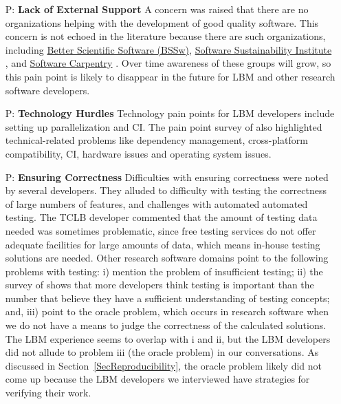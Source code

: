 \documentclass[final, 3p, times, authoryear]{elsarticle}
\newcounter{pnum} %
\begin{document}
\begin{enumerate}
	\item[P\refstepcounter{pnum}\thepnum \label{P_LackExtSupport}:] \textbf{Lack
	of External Support} A concern was raised that there are no organizations
	helping with the development of good quality software.  This concern is not
	echoed in the literature because there are such organizations, including
	\href{https://bssw.io/} {Better Scientific Software (BSSw)},
	\href{https://www.software.ac.uk/} {Software Sustainability Institute}
	\citep{CrouchEtAl2013}, and \href{https://software-carpentry.org/}{Software
	Carpentry} \citep{WilsonAndLumsdaine2006, Wilson2016}. Over time awareness
	of these groups will grow, so this pain point is likely to disappear in the
	future for LBM and other research software developers.
	
	\item[P\refstepcounter{pnum}\thepnum \label{P_TechnologyHurdles}:]
	\textbf{Technology Hurdles} Technology pain points for LBM developers
	include setting up parallelization and CI. The pain
	point survey of \citep{WieseEtAl2019} also highlighted technical-related
	problems like dependency management, cross-platform compatibility,
	CI, hardware issues and operating system issues.

	\item[P\refstepcounter{pnum}\thepnum \label{P_Correctness}:]
	\textbf{Ensuring Correctness} Difficulties with ensuring correctness were
	noted by several developers. They alluded to difficulty with testing the
	correctness of large numbers of features, and challenges with automated
	automated testing. The TCLB developer commented that the amount of testing
	data needed was sometimes problematic, since free testing services do not
	offer adequate facilities for large amounts of data, which means in-house
	testing solutions are needed.  Other research software domains point to the
	following problems with testing: i) \citep{PintoEtAl2018} mention the
	problem of insufficient testing; ii) the survey of \citep{HannayEtAl2009}
	shows that more developers think testing is important than the number that
	believe they have a sufficient understanding of testing concepts; and, iii)
	\citep{HannayEtAl2009, KanewalaAndBieman2013, KellyEtAl2011, WieseEtAl2019}
	point to the oracle problem, which occurs in research software when we do
	not have a means to judge the correctness of the calculated solutions.  The
	LBM experience seems to overlap with i and ii, but the LBM developers did
	not allude to problem iii (the oracle problem) in our conversations.  As
	discussed in Section~\ref{SecReproducibility}, the oracle problem likely did
	not come up because the LBM developers we interviewed have strategies for
	verifying their work.
	

\end{enumerate}
\end{document}
